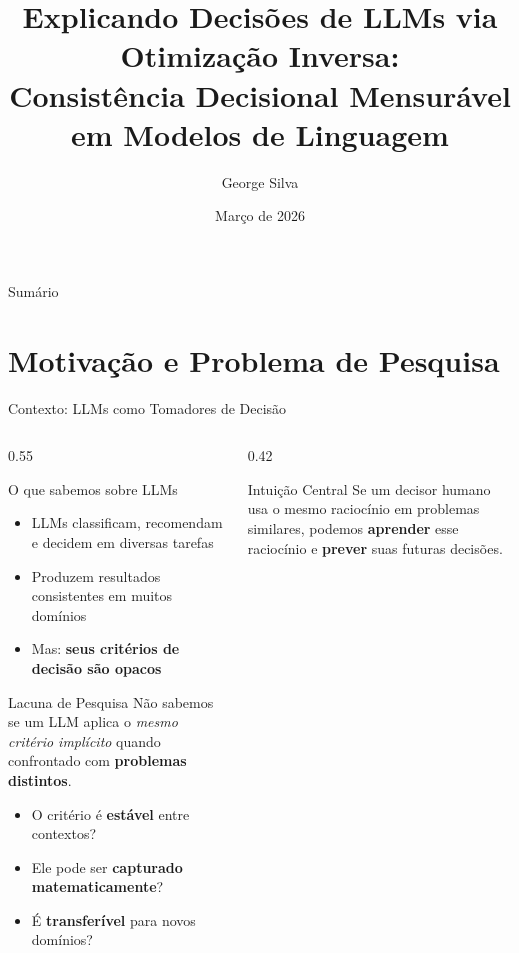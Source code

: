 \documentclass[aspectratio=169, 8pt]{beamer}
\title[Decisões de LLMs via Otimização Inversa]{%
  Explicando Decisões de LLMs via Otimização Inversa:\\
  Consistência Decisional Mensurável em Modelos de Linguagem}
\author[G.\ Silva]{George Silva}
\institute[Mestrado]{%
  Programa de Pós-Graduação em Ciência da Computação\\
  \vspace{0.3em}}
\date{Março de 2026}
\begin{document}
\begin{frame}
  \titlepage
\end{frame}

\begin{frame}{Sumário}
  \tableofcontents
\end{frame}

\section{Motivação e Problema de Pesquisa}

\begin{frame}{Contexto: LLMs como Tomadores de Decisão}
  \begin{columns}[T]
    \begin{column}{0.55\textwidth}
      \begin{block}{O que sabemos sobre LLMs}
        \footnotesize
        \begin{itemize}
          \item LLMs classificam, recomendam e decidem em diversas tarefas
          \item Produzem resultados consistentes em muitos domínios
          \item Mas: \textbf{seus critérios de decisão são opacos}
        \end{itemize}
      \end{block}

      \vspace{0.1em}

      \begin{alertblock}{Lacuna de Pesquisa}
        \footnotesize
        Não sabemos se um LLM aplica o \emph{mesmo critério implícito}
        quando confrontado com \textbf{problemas distintos}.
        \begin{itemize}
          \item O critério é \textbf{estável} entre contextos?
          \item Ele pode ser \textbf{capturado matematicamente}?
          \item É \textbf{transferível} para novos domínios?
        \end{itemize}
      \end{alertblock}
    \end{column}

    \begin{column}{0.42\textwidth}
      \begin{exampleblock}{Intuição Central}
        \footnotesize\centering
        \vspace{0.05em}
        Se um decisor humano usa o mesmo raciocínio em problemas similares,
        podemos \textbf{aprender} esse raciocínio e \textbf{prever} suas
        futuras decisões.


\end{exampleblock}
\end{column}
\end{columns}
\end{frame}
\end{document}
